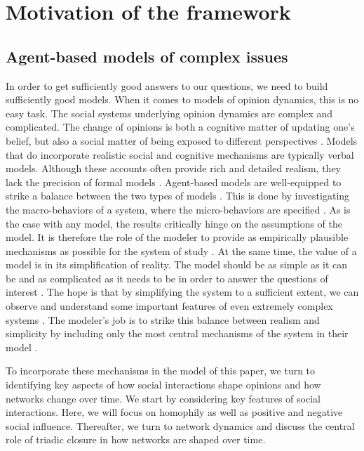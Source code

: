 \documentclass{article}
\begin{document}
\section{Motivation of the framework}
\subsection{Agent-based models of complex issues}

In order to get sufficiently good answers to our questions, we need to build sufficiently good models. When it comes to models of opinion dynamics, this is no easy task. The social systems underlying opinion dynamics are complex and complicated. The change of opinions is both a cognitive matter of updating one’s belief, but also a social matter of being exposed to different perspectives \cite{flache_models_2017,friedkin_social_1990,spears_social_2021}. Models that do incorporate realistic social and cognitive mechanisms are typically verbal models. Although these accounts often provide rich and detailed realism, they lack the precision of formal models \cite{fogarty_ten_2022,galesic_integrating_2021,smaldino_how_2020}. Agent-based models are well-equipped to strike a balance between the two types of models \cite{flache_between_2018,galesic_integrating_2021,epstein1999agent,mas2014cultural} . This is done by investigating the macro-behaviors of a system, where the micro-behaviors are specified \cite{bruch_agent-based_2015,epstein1999agent,flache_between_2018}. As is the case with any model, the results critically hinge on the assumptions of the model. It is therefore the role of the modeler to provide as empirically plausible mechanisms as possible for the system of study \cite{crooks2012introduction,epstein1999agent,page2010diversity}. At the same time, the value of a model is in its simplification of reality. The model should be as simple as it can be and as complicated as it needs to be in order to answer the questions of interest \cite{smaldino_how_2020}. The hope is that by simplifying the system to a sufficient extent, we can observe and understand some important features of even extremely complex systems \cite{fogarty_ten_2022,smaldino_how_2020}. The modeler’s job is to strike this balance between realism and simplicity by including only the most central mechanisms of the system in their model \cite{smaldino_models_2016}. 

To incorporate these mechanisms in the model of this paper, we turn to identifying key aspects of how social interactions shape opinions and how networks change over time. We start by considering key features of social interactions. Here, we will focus on homophily as well as positive and negative social influence. Thereafter, we turn to network dynamics and discuss the central role of triadic closure in how networks are shaped over time.
\end{document}
